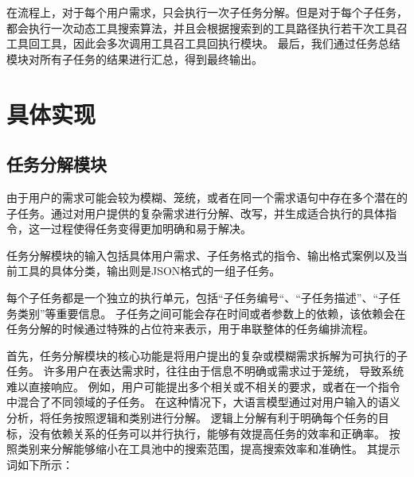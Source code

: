 在流程上，对于每个用户需求，只会执行一次子任务分解。但是对于每个子任务，都会执行一次动态工具搜索算法，并且会根据搜索到的工具路径执行若干次工具召工具回工具，因此会多次调用工具召工具回执行模块。
最后，我们通过任务总结模块对所有子任务的结果进行汇总，得到最终输出。

\section{具体实现}

\subsection{任务分解模块}

由于用户的需求可能会较为模糊、笼统，或者在同一个需求语句中存在多个潜在的子任务。通过对用户提供的复杂需求进行分解、改写，并生成适合执行的具体指令，这一过程使得任务变得更加明确和易于解决。

任务分解模块的输入包括具体用户需求、子任务格式的指令、输出格式案例以及当前工具的具体分类，输出则是JSON格式的一组子任务。

每个子任务都是一个独立的执行单元，包括“子任务编号“、“子任务描述”、“子任务类别”等重要信息。
子任务之间可能会存在时间或者参数上的依赖，该依赖会在任务分解的时候通过特殊的占位符来表示，用于串联整体的任务编排流程。

首先，任务分解模块的核心功能是将用户提出的复杂或模糊需求拆解为可执行的子任务。
许多用户在表达需求时，往往由于信息不明确或需求过于笼统，
导致系统难以直接响应。
例如，用户可能提出多个相关或不相关的要求，或者在一个指令中混合了不同领域的子任务。
在这种情况下，大语言模型通过对用户输入的语义分析，将任务按照逻辑和类别进行分解。
逻辑上分解有利于明确每个任务的目标，没有依赖关系的任务可以并行执行，能够有效提高任务的效率和正确率。
按照类别来分解能够缩小在工具池中的搜索范围，提高搜索效率和准确性。
其提示词如下所示：


